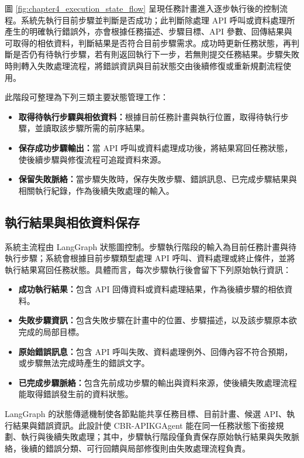 \begin{ZhChapter}
圖 \ref{fig:chapter4_execution_state_flow} 呈現任務計畫進入逐步執行後的控制流程。系統先執行目前步驟並判斷是否成功；此判斷除處理 API 呼叫或資料處理所產生的明確執行錯誤外，亦會根據任務描述、步驟目標、API 參數、回傳結果與可取得的相依資料，判斷結果是否符合目前步驟需求。成功時更新任務狀態，再判斷是否仍有待執行步驟，若有則返回執行下一步，若無則提交任務結果。步驟失敗時則轉入失敗處理流程，將錯誤資訊與目前狀態交由後續修復或重新規劃流程使用。

此階段可整理為下列三類主要狀態管理工作：

\begin{itemize}
    \item \textbf{取得待執行步驟與相依資料：}根據目前任務計畫與執行位置，取得待執行步驟，並讀取該步驟所需的前序結果。
    \item \textbf{保存成功步驟輸出：}當 API 呼叫或資料處理成功後，將結果寫回任務狀態，使後續步驟與修復流程可追蹤資料來源。
    \item \textbf{保留失敗脈絡：}當步驟失敗時，保存失敗步驟、錯誤訊息、已完成步驟結果與相關執行紀錄，作為後續失敗處理的輸入。
\end{itemize}

\subsection{執行結果與相依資料保存}

系統主流程由 LangGraph 狀態圖控制。步驟執行階段的輸入為目前任務計畫與待執行步驟；系統會根據目前步驟類型處理 API 呼叫、資料處理或終止條件，並將執行結果寫回任務狀態。具體而言，每次步驟執行後會留下下列原始執行資訊：

\begin{itemize}
    \item \textbf{成功執行結果：}包含 API 回傳資料或資料處理結果，作為後續步驟的相依資料。
    \item \textbf{失敗步驟資訊：}包含失敗步驟在計畫中的位置、步驟描述，以及該步驟原本欲完成的局部目標。
    \item \textbf{原始錯誤訊息：}包含 API 呼叫失敗、資料處理例外、回傳內容不符合預期，或步驟無法完成時產生的錯誤文字。
    \item \textbf{已完成步驟脈絡：}包含先前成功步驟的輸出與資料來源，使後續失敗處理流程能取得錯誤發生前的資料狀態。
\end{itemize}

LangGraph 的狀態傳遞機制使各節點能共享任務目標、目前計畫、候選 API、執行結果與錯誤資訊。此設計使 CBR-APIKGAgent 能在同一任務狀態下銜接規劃、執行與後續失敗處理；其中，步驟執行階段僅負責保存原始執行結果與失敗脈絡，後續的錯誤分類、可行回饋與局部修復則由失敗處理流程負責。


\end{ZhChapter}
